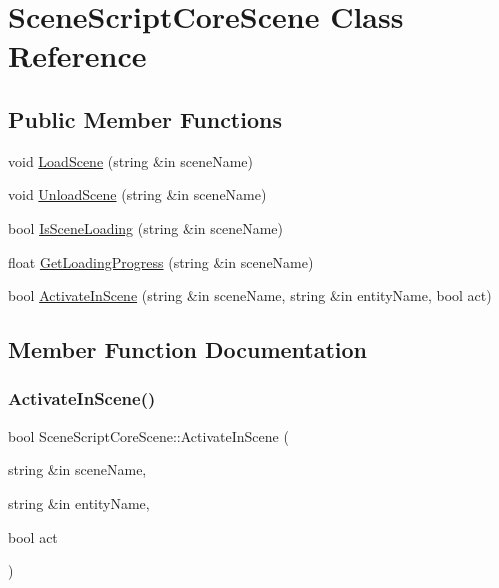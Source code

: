 \hypertarget{class_scene_script_core_scene}{}\section{Scene\+Script\+Core\+Scene Class Reference}
\label{class_scene_script_core_scene}
\subsection*{Public Member Functions}
\begin{DoxyCompactItemize}
\item 
void \hyperlink{class_scene_script_core_scene_a8d48c4f916876346116bf5e49f827da8}{Load\+Scene} (string \&in scene\+Name)
\item 
void \hyperlink{class_scene_script_core_scene_abb60f7f26f69b64a2fd6c9e6f7023cfd}{Unload\+Scene} (string \&in scene\+Name)
\item 
bool \hyperlink{class_scene_script_core_scene_a167e7b752282eb353a4267b2576f45c2}{Is\+Scene\+Loading} (string \&in scene\+Name)
\item 
float \hyperlink{class_scene_script_core_scene_a47b07594325ac14af21f21ddc8c3edaa}{Get\+Loading\+Progress} (string \&in scene\+Name)
\item 
bool \hyperlink{class_scene_script_core_scene_a58867bfabaa186ca49137af40edc9252}{Activate\+In\+Scene} (string \&in scene\+Name, string \&in entity\+Name, bool act)
\end{DoxyCompactItemize}


\subsection{Member Function Documentation}
\hypertarget{class_scene_script_core_scene_a58867bfabaa186ca49137af40edc9252}{}\label{class_scene_script_core_scene_a58867bfabaa186ca49137af40edc9252} 
\subsubsection{\texorpdfstring{Activate\+In\+Scene()}{ActivateInScene()}}
{\footnotesize\ttfamily bool Scene\+Script\+Core\+Scene\+::\+Activate\+In\+Scene (\begin{DoxyParamCaption}\item[{string \&in}]{scene\+Name,  }\item[{string \&in}]{entity\+Name,  }\item[{bool}]{act }\end{DoxyParamCaption})}

